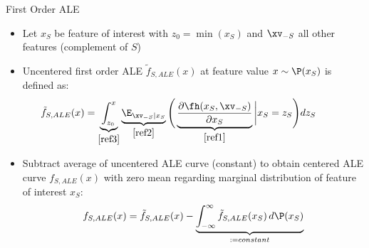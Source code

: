 \documentclass[11pt,compress,t,notes=noshow, aspectratio=169, xcolor=table]{beamer}
\begin{document}


\begin{frame}{First Order ALE}

\begin{itemize}%
\item Let $x_S$ be feature of interest with $z_0 = \min(x_S)$ and $\xv_{-S}$ all other features  (complement of $S$)
\item Uncentered first order ALE $\tilde{f}_{S, ALE}(x)$ at feature value $x \sim \P(x_S)$ is defined as:  
$$
\begin{aligned}
\hspace*{-0.7cm} 
\tilde{f}_{S, ALE}(x) &= \underbrace{\int_{z_{0}}^{x}}_{ \eqref{ref3}} \underbrace{\E_{\xv_{-S} \vert x_S}}_{\eqref{ref2}} \Bigg(  \underbrace{\frac{\partial \fh(x_S, \xv_{-S})}{\partial x_S}}_{\eqref{ref1}} \bigg \vert x_S = z_S \Bigg) dz_S %
\end{aligned}
$$
\pause
\item Subtract average of uncentered ALE curve (constant) to obtain centered ALE curve $f_{S, ALE}(x)$ with zero mean regarding marginal distribution of feature of interest $x_S$:
$$
\begin{aligned}
f_{S, ALE}(x) = \tilde{f}_{S, ALE}(x) - \underbrace{\int_{-\infty}^{\infty}\tilde{f}_{S, ALE}(x_S) \, d\P(x_S)}_{:= constant}
\end{aligned}
$$
\end{itemize}



\end{frame}
\end{document}
